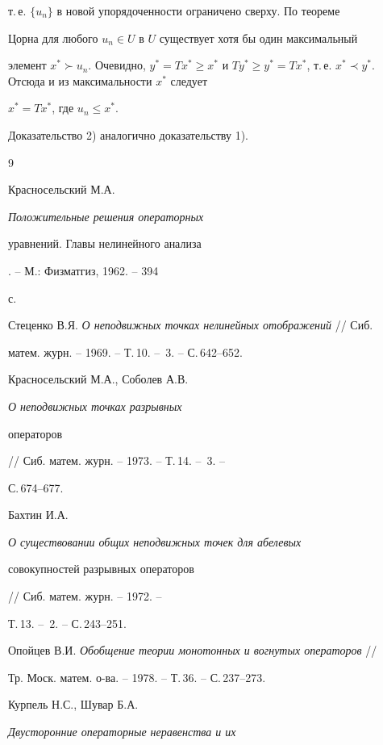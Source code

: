 т.\,е. $\{u_n\}$ в новой упорядоченности ограничено сверху. По теореме 


Цорна для любого $u_n\in U$ в $U$ существует хотя бы один максимальный 


элемент $x^*\succ u_n$. Очевидно, $y^*=T x^*\ge x^*$ и $T y^*\ge y^*=T 


x^*$, т.\,е. $x^*\prec y^*$. Отсюда и из максимальности $x^*$ следует 


$x^*=T x^*$, где $u_n\le x^*$. 


 


Доказательство 2) аналогично доказательству 1). 


 


\begin{thebibliography}{9} 


 




Красносельский М.А. {\em Положительные решения операторных 


уравнений. Главы нелинейного анализа}. -- М.: Физматгиз, 1962. -- 394 


с. 




Стеценко В.Я. {\em О неподвижных точках нелинейных отображений} // Сиб. 


матем. журн. -- 1969. -- Т.\,10. -- \No\,3. -- С.\,642--652. 




Красносельский М.А., Соболев А.В. {\em О неподвижных точках разрывных 


операторов} // Сиб. матем. журн. -- 1973. -- Т.\,14. -- \No\,3. -- 


С.\,674--677. 




Бахтин И.А. {\em О существовании общих неподвижных точек для абелевых 


совокупностей разрывных операторов} // Сиб. матем. журн. -- 1972. -- 


Т.\,13. -- \No\,2. -- С.\,243--251. 




Опойцев В.И. {\em Обобщение теории монотонных и вогнутых операторов} // 


Тр. Моск. матем. о-ва. -- 1978. -- Т.\,36. -- С.\,237--273. 




Курпель Н.С., Шувар Б.А. {\em Двусторонние операторные неравенства и их 


}
\end{thebibliography}

